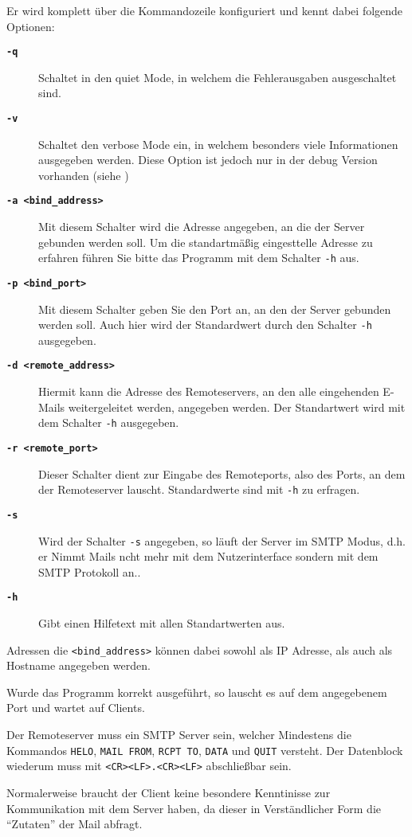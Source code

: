 Er wird komplett \"{u}ber die Kommandozeile konfiguriert und kennt dabei folgende Optionen:
\begin{description}
  \item[\texttt\bf{-q}] Schaltet in den quiet Mode, in welchem die Fehlerausgaben ausgeschaltet sind.
  \item[\texttt\bf{-v}] Schaltet den verbose Mode ein, in welchem besonders viele Informationen ausgegeben werden. Diese Option ist jedoch nur in der debug Version vorhanden (siehe )
  \item[\texttt\bf{-a <bind\_address>}] Mit diesem Schalter wird die Adresse angegeben, an die der Server gebunden werden soll. Um die standartm\"{a}ßig eingesttelle Adresse zu erfahren f\"{u}hren Sie bitte das Programm mit dem Schalter \texttt{-h} aus. 
  \item[\texttt\bf{-p <bind\_port>}] Mit diesem Schalter geben Sie den Port an, an den der Server gebunden werden soll. Auch hier wird der Standardwert durch den Schalter \texttt{-h} ausgegeben.
  \item[\texttt\bf{-d <remote\_address>}] Hiermit kann die Adresse des Remoteservers, an den alle eingehenden E-Mails weitergeleitet werden, angegeben werden. Der Standartwert wird mit dem Schalter \texttt{-h} ausgegeben.
  \item[\texttt\bf{-r <remote\_port>}] Dieser Schalter dient zur Eingabe des Remoteports, also des Ports, an dem der Remoteserver lauscht. Standardwerte sind mit \texttt{-h} zu erfragen.
  \item[\texttt\bf{-s}] Wird der Schalter \texttt{-s} angegeben, so l\"{a}uft der Server im SMTP Modus, d.h. er Nimmt Mails ncht mehr mit dem Nutzerinterface sondern mit dem SMTP Protokoll an.. 
  \item[\texttt\bf{-h}] Gibt einen Hilfetext mit allen Standartwerten aus. 
\end{description}
Adressen die \texttt{<bind\_address>} k\"{o}nnen dabei sowohl als IP Adresse, als auch als Hostname angegeben werden.

Wurde das Programm korrekt ausgef\"{u}hrt, so lauscht es auf dem angegebenem Port und wartet auf Clients.

Der Remoteserver muss ein SMTP Server sein, welcher Mindestens die Kommandos \texttt{HELO}, \texttt{MAIL FROM}, \texttt{RCPT TO}, \texttt{DATA} und \texttt{QUIT} versteht. Der Datenblock wiederum muss mit \texttt{<CR><LF>.<CR><LF>} abschließbar sein.

Normalerweise braucht der Client keine besondere Kenntinisse zur Kommunikation mit dem Server haben, da dieser in Verst\"{a}ndlicher Form die ``Zutaten'' der Mail abfragt.

